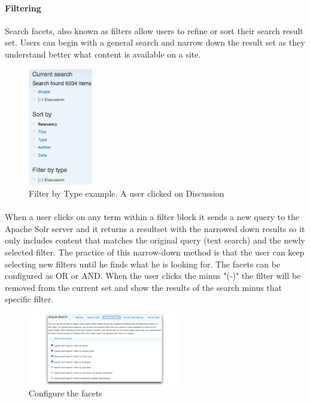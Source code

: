 \paragraph{Filtering}
Search facets, also known as filters allow users to refine or sort their search result set. Users can begin with a general search and narrow down the result set as they understand better what content is available on a site.

\begin{figure}
\begin{center}
     \includegraphics[width=0.25\textwidth]{images/Search_facet_ex_4_by-type-ex-1.png}
     \caption{Filter by Type example. A user clicked on Discussion}\end{center}
\end{figure}
\paragraph{}
When a user clicks on any term within a filter block it sends a new query to the Apache Solr server and it returns a resultset with the narrowed down results so it only includes content that matches the original query (text search) and the newly selected filter. 
The practice of this narrow-down method is that the user can keep selecting new filters until he finds what he is looking for. The facets can be configured as OR or AND. When the user clicks the minus "(-)" the filter will be removed from the current set and show the results of the search minus that specific filter.

\begin{figure}
\begin{center}
\includegraphics[width=0.60\textwidth]{images/enabled_search_filters_page-1.png}
\caption{Configure the facets}
\end{center}
\end{figure}

